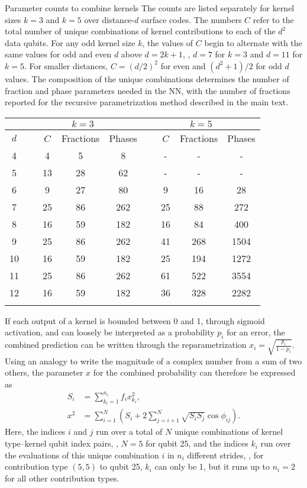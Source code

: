 \begin{table}[htbp]
\centering
\ccaption
{Parameter counts to combine kernels}
{
The counts are listed separately for kernel sizes $k=3$ and $k=5$ over distance-$d$ surface codes.
The numbers $C$ refer to the total number of unique combinations of kernel contributions to each of the $d^2$ data qubits.
For any odd kernel size $k$, the values of $C$ begin to alternate with the same values for odd and even $d$ above $d=2k+1$, \ie, $d=7$ for $k=3$ and $d=11$ for $k=5$.
For smaller distances, $C=(d/2)^2$ for even and $(d^2+1)/2$ for odd $d$ values.
The composition of the unique combinations determines the number of fraction and phase parameters needed in the NN,
with the number of fractions reported for the recursive parametrization method described in the main text.
}
\renewcommand{\arraystretch}{1.25}
\begin{tabular}{c ccc ccc}
\hline
      & \multicolumn{3}{c}{$k=3$}   & \multicolumn{3}{c}{$k=5$} \\
\hline
$d$ & ~~~$C$ & Fractions & Phases & ~~~$C$ & Fractions & Phases \\
\hline
4 & ~~~4 & 5 & 8 & ~~~- & - & - \\
5 & ~~~13 & 28 & 62 & ~~~- & - & - \\
6 & ~~~9 & 27 & 80 & ~~~9 & 16 & 28 \\
7 & ~~~25 & 86 & 262 & ~~~25 & 88 & 272 \\
8 & ~~~16 & 59 & 182 & ~~~16 & 84 & 400 \\
9 & ~~~25 & 86 & 262 & ~~~41 & 268 & 1504 \\
10 & ~~~16 & 59 & 182 & ~~~25 & 194 & 1272 \\
11 & ~~~25 & 86 & 262 & ~~~61 & 522 & 3554 \\
12 & ~~~16 & 59 & 182 & ~~~36 & 328 & 2282 \\
\hline
\label{table:unique-kern-contribs}
\end{tabular}
\end{table}



If each output of a kernel is bounded between 0 and 1, through sigmoid activation, and can loosely be interpreted as a probability $p_i$ for an error, the combined prediction can be written through the reparametrization $x_i=\sqrt{\frac{p_i}{1-p_i}}$. Using an analogy to write the magnitude of a complex number from a sum of two others, the parameter $x$ for the combined probability can therefore be expressed as
\begin{equation}
\begin{aligned}
S_i &= \sum_{k_i=1}^{n_i} f_i x^2_{k_i}, \\
x^2 &= \sum_{i=1}^{N} \left( S_i + 2 \sum_{j=i+1}^{N} \sqrt{S_i S_j} \cos{\phi_{ij}} \right).
\end{aligned}
\label{eq:kernsum}
\end{equation}
Here, the indices $i$ and $j$ run over a total of $N$ unique combinations of kernel type--kernel qubit index pairs, \eg, $N=5$ for qubit 25, and the indices $k_i$ run over the evaluations of this unique combination $i$ in $n_i$ different strides, \eg, for contribution type $(5,5)$ to qubit 25, $k_i$ can only be 1, but it runs up to $n_i=2$ for all other contribution types.

